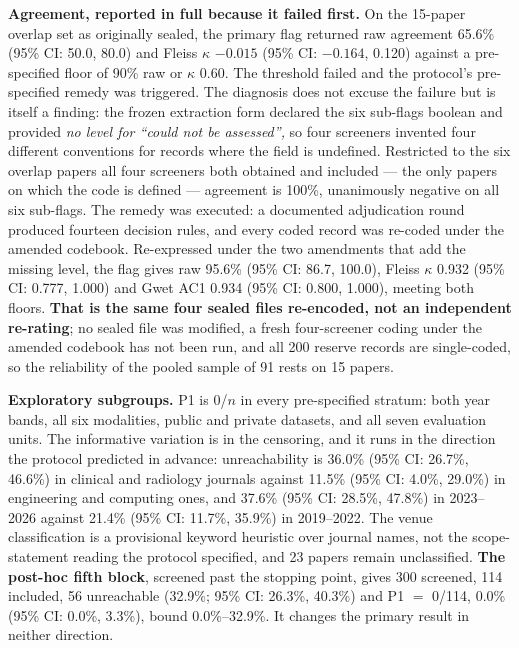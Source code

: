 \documentclass[11pt,a4paper]{article}
\begin{document}
\textbf{Agreement, reported in full because it failed first.} On the 15-paper
overlap set as originally sealed, the primary flag returned raw agreement 65.6\%
(95\% CI: 50.0, 80.0) and Fleiss $\kappa$ $-0.015$ (95\% CI: $-0.164$, 0.120)
against a pre-specified floor of 90\% raw or $\kappa$ 0.60. The threshold failed
and the protocol's pre-specified remedy was triggered. The diagnosis does not excuse the
failure but is itself a finding: the frozen extraction form declared the six
sub-flags boolean and provided \emph{no level for ``could not be assessed'',} so
four screeners invented four different conventions for records where the field is
undefined. Restricted to the six overlap papers all four screeners both obtained
and included --- the only papers on which the code is defined --- agreement is
100\%, unanimously negative on all six sub-flags. The remedy was executed: a
documented adjudication round produced fourteen decision rules, and every coded
record was re-coded under the amended codebook. Re-expressed under the two
amendments that add the missing level, the flag gives raw 95.6\% (95\% CI: 86.7,
100.0), Fleiss $\kappa$ 0.932 (95\% CI: 0.777, 1.000) and Gwet AC1 0.934 (95\%
CI: 0.800, 1.000), meeting both floors. \textbf{That is the same four sealed
files re-encoded, not an independent re-rating}; no sealed file was modified, a
fresh four-screener coding under the amended codebook has not been run, and all
200 reserve records are single-coded, so the reliability of the pooled sample of
91 rests on 15 papers.

\textbf{Exploratory subgroups.} P1 is 0/$n$ in every pre-specified stratum: both
year bands, all six modalities, public and private datasets, and all seven
evaluation units. The informative variation is in the censoring, and it runs in
the direction the protocol predicted in advance: unreachability is 36.0\% (95\%
CI: 26.7\%, 46.6\%) in clinical and radiology journals against 11.5\% (95\% CI:
4.0\%, 29.0\%) in engineering and computing ones, and 37.6\% (95\% CI: 28.5\%,
47.8\%) in 2023--2026 against 21.4\% (95\% CI: 11.7\%, 35.9\%) in 2019--2022.
The venue classification is a provisional keyword heuristic over journal names,
not the scope-statement reading the protocol specified, and 23 papers remain
unclassified. \textbf{The post-hoc fifth block}, screened past the stopping
point, gives 300 screened, 114 included, 56 unreachable (32.9\%; 95\% CI: 26.3\%,
40.3\%) and P1 $=$ 0/114, 0.0\% (95\% CI: 0.0\%, 3.3\%), bound 0.0\%--32.9\%. It
changes the primary result in neither direction.
\end{document}
